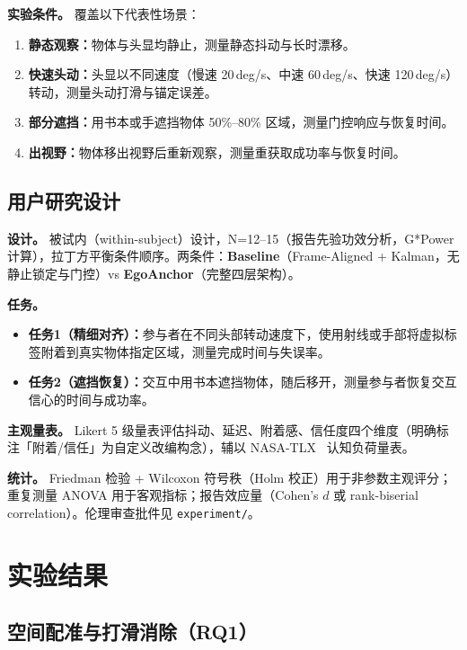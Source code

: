 \documentclass[review]{vgtc}
\begin{document}
\noindent\textbf{实验条件。} 覆盖以下代表性场景：
\begin{enumerate}[leftmargin=1.4em]
  \item \textbf{静态观察：}物体与头显均静止，测量静态抖动与长时漂移。
  \item \textbf{快速头动：}头显以不同速度（慢速 20\,deg/s、中速 60\,deg/s、快速 120\,deg/s）转动，测量头动打滑与锚定误差。
  \item \textbf{部分遮挡：}用书本或手遮挡物体 50\%--80\% 区域，测量门控响应与恢复时间。
  \item \textbf{出视野：}物体移出视野后重新观察，测量重获取成功率与恢复时间。
\end{enumerate}

\subsection{用户研究设计}

\noindent\textbf{设计。} 被试内（within-subject）设计，N=12--15（报告先验功效分析，G*Power 计算），拉丁方平衡条件顺序。两条件：\textbf{Baseline}（Frame-Aligned + Kalman，无静止锁定与门控）vs \textbf{EgoAnchor}（完整四层架构）。

\noindent\textbf{任务。}
\begin{itemize}[leftmargin=1.4em]
  \item \textbf{任务1（精细对齐）：}参与者在不同头部转动速度下，使用射线或手部将虚拟标签附着到真实物体指定区域，测量完成时间与失误率。
  \item \textbf{任务2（遮挡恢复）：}交互中用书本遮挡物体，随后移开，测量参与者恢复交互信心的时间与成功率。
\end{itemize}

\noindent\textbf{主观量表。} Likert 5 级量表评估抖动、延迟、附着感、信任度四个维度（明确标注「附着/信任」为自定义改编构念），辅以 NASA-TLX~\cite{hart1988nasatlx} 认知负荷量表。

\noindent\textbf{统计。} Friedman 检验 + Wilcoxon 符号秩（Holm 校正）用于非参数主观评分；重复测量 ANOVA 用于客观指标；报告效应量（Cohen's $d$ 或 rank-biserial correlation）。伦理审查批件见 \texttt{experiment/}。

\section{实验结果}
\subsection{空间配准与打滑消除（RQ1）}
\end{document}
